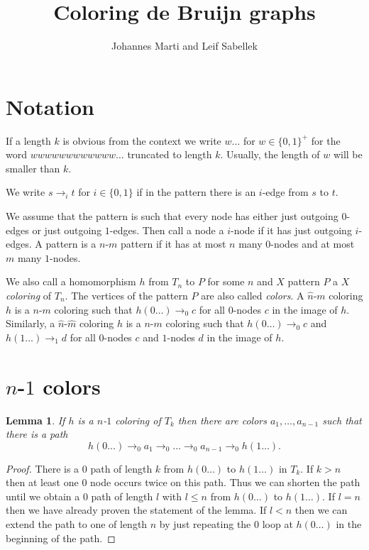 \documentclass[a4paper]{article}
\title{Coloring de Bruijn graphs}
\author{Johannes Marti and Leif Sabellek}
\newtheorem{lemma}[theorem]{Lemma}
\begin{document}
\maketitle

\section{Notation}

If a length $k$ is obvious from the context we write $w\dots$ for $w \in
\{0,1\}^+$ for the word $w w w w w w w w w w w w \dots$ truncated to
length $k$. Usually, the length of $w$ will be smaller than $k$.

We write $s \rightarrow_i t$ for $i \in \{0,1\}$ if in the pattern there
is an $i$-edge from $s$ to $t$.

We assume that the pattern is such that every node has either just
outgoing $0$-edges or just outgoing $1$-edges. Then call a node a
$i$-node if it has just outgoing $i$-edges. A pattern is a $n$-$m$
pattern if it has at most $n$ many $0$-nodes and at most $m$ many
$1$-nodes. 

We also call a homomorphism $h$ from $T_n$ to $P$ for some $n$ and $X$
pattern $P$ a \emph{$X$ coloring} of $T_n$. The vertices of the pattern
$P$ are also called \emph{colors}. A $\hat{n}$-$m$ coloring $h$ is a
$n$-$m$ coloring such that $h(0\dots) \rightarrow_0 c$ for all $0$-nodes
$c$ in the image of $h$. Similarly, a $\hat{n}$-$\hat{m}$ coloring $h$
is a $n$-$m$ coloring such that $h(0\dots) \rightarrow_0 c$ and
$h(1\dots) \rightarrow_1 d$ for all $0$-nodes $c$ and $1$-nodes $d$ in
the image of $h$.

\section{$n$-$1$ colors}

\begin{lemma} \label{l:path to other loop}
 If $h$ is a $n$-$1$ coloring of $T_k$ then there are colors
$a_1,\dots,a_{n - 1}$ such that there is a path
\[
 h(0\dots) \rightarrow_0 a_1 \rightarrow_0 \dots \rightarrow_0 a_{n - 1}
\rightarrow_0 h(1\dots).
\]
\end{lemma}
\begin{proof}
 There is a $0$ path of length $k$ from $h(0\dots)$ to $h(1\dots)$ in
$T_k$. If $k > n$ then at least one $0$ node occurs twice on this path.
Thus we can shorten the path until we obtain a $0$ path of length $l$
with $l \leq n$ from $h(0\dots)$ to $h(1\dots)$. If $l = n$ then we have
already proven the statement of the lemma. If $l < n$ then we can extend
the path to one of length $n$ by just repeating the $0$ loop at
$h(0\dots)$ in the beginning of the path.
\end{proof}
\end{document}
